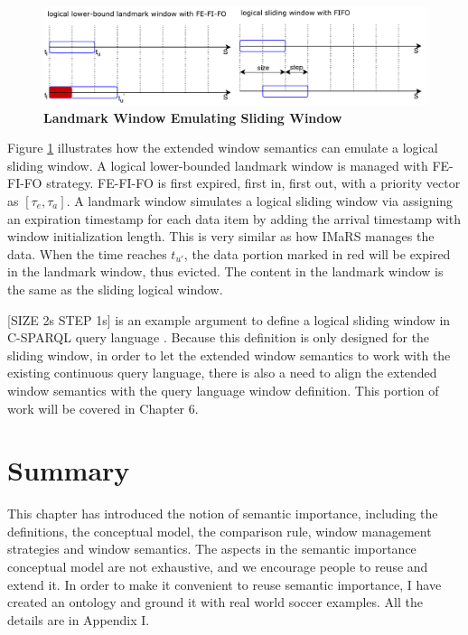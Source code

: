 \begin{figure}[!htbp]
	\centering
    \includegraphics[width=5in]{img/3-lwcsw.pdf}
    \caption{\textbf{Landmark Window Emulating Sliding Window}} 
    \label{fig:lwesw}
\end{figure}

Figure \ref{fig:lwesw} illustrates how the extended window semantics can emulate a logical sliding window.
A logical lower-bounded landmark window is managed with FE-FI-FO strategy.
FE-FI-FO is first expired, first in, first out, with a priority vector as $[\tau_{e}, \tau_{a}]$. 
A landmark window simulates a logical sliding window via assigning an expiration timestamp for each data item by adding the arrival timestamp with window initialization length.
This is very similar as how IMaRS \cite{barbieri2010incremental} manages the data. 
When the time reaches $t_{u'}$, the data portion marked in red will be expired in the landmark window, thus evicted. 
The content in the landmark window is the same as the sliding logical window. 

[SIZE 2s STEP 1s] is an example argument to define a logical sliding window in C-SPARQL query language \cite{barbieri2009c}.
Because this definition is only designed for the sliding window, in order to let the extended window semantics to work with the existing continuous query language, there is also a need to align the extended window semantics with the query language window definition.
This portion of work will be covered in Chapter 6. 
%
\section{Summary}
This chapter has introduced the notion of semantic importance, including the definitions, the conceptual model, the comparison rule, window management strategies and window semantics. 
The aspects in the semantic importance conceptual model are not exhaustive, and we encourage people to reuse and extend it. 
In order to make it convenient to reuse semantic importance, I have created an ontology and ground it with real world soccer examples. 
All the details are in Appendix I. 

